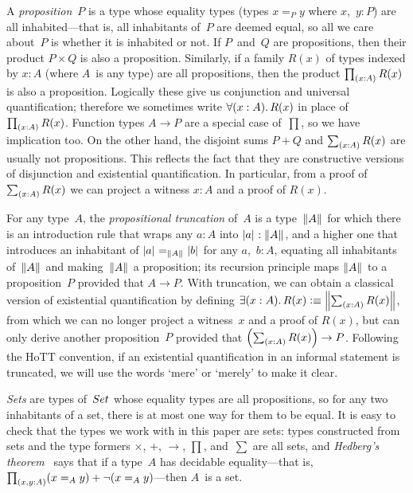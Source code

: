 \documentclass[a4paper,UKenglish,numberwithinsect,cleveref,thm-restate]{lipics-v2021}
\numberwithin{equation}{section}
\theoremstyle{definition}
\theoremstyle{plain}
\begin{document}
A \emph{proposition}~$P$ is a type whose equality types (types $x =_P y$ where $x$,~$y : P$) are all inhabited---that is, all inhabitants of~$P$ are deemed equal, so all we care about~$P$ is whether it is inhabited or not.
If $P$~and~$Q$ are propositions, then their product $P \times Q$ is also a proposition.
Similarly, if a family $R(x)$ of types indexed by $x : A$ (where $A$~is any type) are all propositions, then the product $\prd{x : A} R(x)$ is also a proposition.
Logically these give us conjunction and universal quantification; therefore we sometimes write $\fall{x : A} R(x)$ in place of $\prd{x : A} R(x)$.
Function types $A \to P$ are a special case of~$\prod$, so we have implication too.
On the other hand, the disjoint sums $P + Q$ and $\sm{x : A} R(x)$ are usually not propositions.
This reflects the fact that they are constructive versions of disjunction and existential quantification.
In particular, from a proof of $\sm{x : A} R(x)$ we can project a witness $x : A$ and a proof of $R(x)$.

For any type~$A$, the \emph{propositional truncation} of~$A$ is a type~$\mathopen{}\left\Vert A\right\Vert_{}\mathclose{}$ for which there is an introduction rule that wraps any $a : A$ into $\mathopen{}\left|a\right|_{}^{}\mathclose{} : \mathopen{}\left\Vert A\right\Vert_{}\mathclose{}$, and a higher one that introduces an inhabitant of $\mathopen{}\left|a\right|_{}^{}\mathclose{} =_{\mathopen{}\left\Vert A\right\Vert_{}\mathclose{}} \mathopen{}\left|b\right|_{}^{}\mathclose{}$ for any $a$,~$b : A$, equating all inhabitants of~$\mathopen{}\left\Vert A\right\Vert_{}\mathclose{}$ and making~$\mathopen{}\left\Vert A\right\Vert_{}\mathclose{}$ a proposition; its recursion principle maps $\mathopen{}\left\Vert A\right\Vert_{}\mathclose{}$ to a proposition~$P$ provided that $A \to P$.
With truncation, we can obtain a classical version of existential quantification by defining $\exis{x : A} R(x) \defeq \brck{\sm{x : A} R(x)}$, from which we can no longer project a witness~$x$ and a proof of $R(x)$, but can only derive another proposition~$P$ provided that $\left(\sm{x : A} R(x)\right) \to P$.
Following the HoTT convention, if an existential quantification in an informal statement is truncated, we will use the words `mere' or `merely' to make it clear.

\emph{Sets} are types of~$\set$ whose equality types are all propositions, so for any two inhabitants of a set, there is at most one way for them to be equal.
It is easy to check that the types we work with in this paper are sets: types constructed from sets and the type formers $\times$, $+$, $\to$, $\prod$, and~$\sum$ are all sets, and \emph{Hedberg's theorem}~\cite[Section~7.2]{hottbook} says that if a type~$A$ has decidable equality---that is, $\prd{x, y : A} (x =_A y) + \neg(x =_A y)$---then $A$~is a set.

\end{document}
